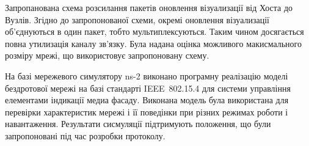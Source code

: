 \documentclass[a4paper,ukrainian,utf8,nocolumnsxix,floatsection,equationsection]{eskdtext}
\newcommand{\iee}[0]{IEEE~802.15.4\xspace}
\begin{document}
Запропанована схема розсилання пакетів оновлення візуализації від Хоста до Вузлів. Згідно до запропонованої схеми, окремі оновлення візуализації об’єднуються в один пакет, тобто мультиплексуються. Таким чином досягається повна утилизація каналу зв’язку. Була надана оцінка можливого макисмального розміру мрежі, що використовує запропоновану схему.

На базі мережевого симулятору ns-2 виконано програмну реалізацію моделі бездротової мережі на базі стандарті \iee для системи управління елементами індикації медиа фасаду. Виконана модель була використана для перевірки характеристик мережі і її поведінки при різних режимах роботи і навантаження. Результати сисмуляції підтримують положення, що були запропоновані під час розробки протоколу.



% 



\end{document}
